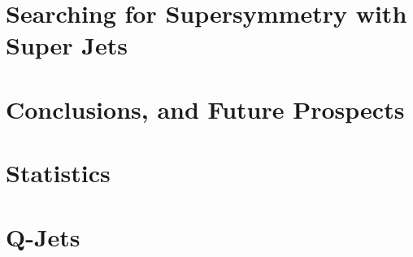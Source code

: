 \documentclass{report}
\begin{document}
\chapter{Searching for Supersymmetry with Super Jets}



\chapter{Conclusions, and Future Prospects}



\appendix
\chapter{Statistics}

\chapter{Q-Jets}



\end{document}
